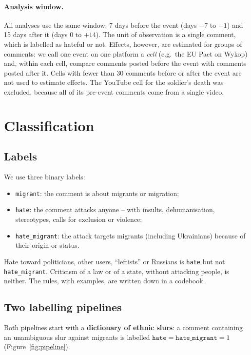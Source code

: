 \documentclass[11pt]{article}
\begin{document}
\paragraph{Analysis window.} All analyses use the same window: 7 days before the event (days $-7$ to $-1$) and 15 days after it (days $0$ to $+14$). The unit of observation is a single comment, which is labelled as hateful or not. Effects, however, are estimated for groups of comments: we call one event on one platform a \emph{cell} (e.g.\ the EU Pact on Wykop) and, within each cell, compare comments posted before the event with comments posted after it. Cells with fewer than 30 comments before or after the event are not used to estimate effects. The YouTube cell for the soldier's death was excluded, because all of its pre-event comments come from a single video.

\section{Classification}

\subsection{Labels}
We use three binary labels:
\begin{itemize}
  \item \texttt{migrant}: the comment is about migrants or migration;
  \item \texttt{hate}: the comment attacks anyone -- with insults, dehumanisation, stereotypes, calls for exclusion or violence;
  \item \texttt{hate\_migrant}: the attack targets migrants (including Ukrainians) because of their origin or status.
\end{itemize}
Hate toward politicians, other users, ``leftists'' or Russians is \texttt{hate} but not \texttt{hate\_migrant}. Criticism of a law or of a state, without attacking people, is neither. The rules, with examples, are written down in a codebook.

\subsection{Two labelling pipelines}

Both pipelines start with a \textbf{dictionary of ethnic slurs}: a comment containing an unambiguous slur against migrants is labelled $\texttt{hate} = \texttt{hate\_migrant} = 1$ (Figure~\ref{fig:pipeline}).
\end{document}
